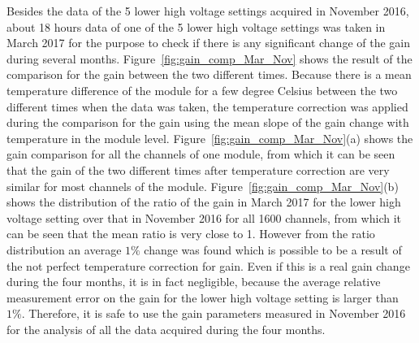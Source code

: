 \documentclass[preprint,sort&compress,12pt]{elsarticle}
\begin{document}
Besides the data of the 5 lower high voltage settings acquired in November 2016, about 18 hours data of one of the 5 lower high voltage settings was taken in March 2017 for the purpose to check if there is any significant change of the gain during several months. Figure~\ref{fig:gain_comp_Mar_Nov} shows the result of the comparison for the gain between the two different times. Because there is a mean temperature difference of the module for a few degree Celsius between the two different times when the data was taken, the temperature correction was applied during the comparison for the gain using the mean slope of the gain change with temperature in the module level. Figure~\ref{fig:gain_comp_Mar_Nov}(a) shows the gain comparison for all the channels of one module, from which it can be seen that the gain of the two different times after temperature correction are very similar for most channels of the module. Figure~\ref{fig:gain_comp_Mar_Nov}(b) shows the distribution of the ratio of the gain in March 2017 for the lower high voltage setting over that in November 2016 for all 1600 channels, from which it can be seen that the mean ratio is very close to 1. However from the ratio distribution an average $1\%$ change was found which is possible to be a result of the not perfect temperature correction for gain. Even if this is a real gain change during the four months, it is in fact negligible, because the average relative measurement error on the gain for the lower high voltage setting is larger than $1\%$. Therefore, it is safe to use the gain parameters measured in November 2016 for the analysis of all the data acquired during the four months.
\end{document}
